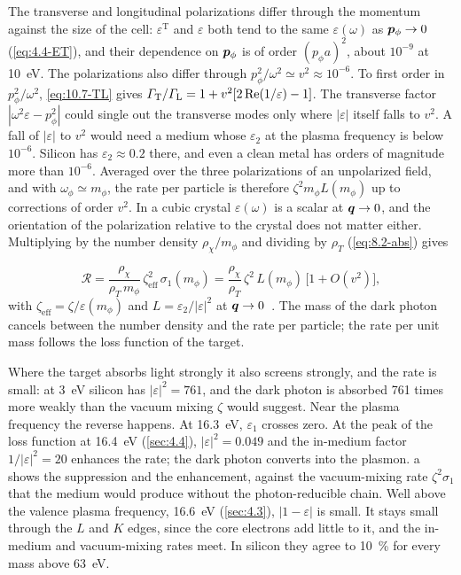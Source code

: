 The transverse and longitudinal polarizations differ through the momentum against the size of the cell: $\varepsilon^{\mathrm{T}}$ and $\varepsilon$ both tend to the same $\varepsilon(\omega)$ as $\bm{p}_\phi \to 0$ (\cref{eq:4.4-ET}), and their dependence on $\bm{p}_\phi$ is of order $(p_\phi a)^2$, about $10^{-9}$ at \SI{10}{eV}. The polarizations also differ through $p_\phi^2/\omega^2 \simeq v^2 \approx 10^{-6}$. To first order in $p_\phi^2/\omega^2$, \cref{eq:10.7-TL} gives $\varGamma_{\mathrm{T}}/\varGamma_{\mathrm{L}} = 1 + v^2[2\operatorname{Re}(1/\varepsilon) - 1]$. The transverse factor $|\omega^2\varepsilon - p_\phi^2|$ could single out the transverse modes only where $|\varepsilon|$ itself falls to $v^2$. A fall of $|\varepsilon|$ to $v^2$ would need a medium whose $\varepsilon_2$ at the plasma frequency is below $10^{-6}$. Silicon has $\varepsilon_2 \approx 0.2$ there, and even a clean metal has orders of magnitude more than $10^{-6}$. Averaged over the three polarizations of an unpolarized field, and with $\omega_\phi \simeq m_\phi$, the rate per particle is therefore $\zeta^2m_\phi L(m_\phi)$ up to corrections of order $v^2$. In a cubic crystal $\varepsilon(\omega)$ is a scalar at $\bm{q} \to 0$, and the orientation of the polarization relative to the crystal does not matter either. Multiplying by the number density $\rho_\chi/m_\phi$ and dividing by $\rho_T$ (\cref{eq:8.2-abs}) gives
\begin{keyresult}
\begin{equation}
  \mathcal{R} = \frac{\rho_\chi}{\rho_T\,m_\phi}\,\zeta_{\mathrm{eff}}^2\,\sigma_1(m_\phi) = \frac{\rho_\chi}{\rho_T}\,\zeta^2\,L(m_\phi)\,\bigl[1 + O(v^2)\bigr] ,
  \label{eq:10.7-dp}
\end{equation}
with $\zeta_{\mathrm{eff}} = \zeta/\varepsilon(m_\phi)$ and $L = \varepsilon_2/|\varepsilon|^2$ at $\bm{q} \to 0$~\cites[Eq.~(7)]{hochberg2017absorption}[Eq.~(3)]{berlin2024absorption}. The mass of the dark photon cancels between the number density and the rate per particle; the rate per unit mass follows the loss function of the target.
\end{keyresult}
\noindent Where the target absorbs light strongly it also screens strongly, and the rate is small: at \SI{3}{eV} silicon has $|\varepsilon|^2 = 761$, and the dark photon is absorbed 761 times more weakly than the vacuum mixing $\zeta$ would suggest. Near the plasma frequency the reverse happens. At \SI{16.3}{eV}, $\varepsilon_1$ crosses zero. At the peak of the loss function at \SI{16.4}{eV} (\cref{sec:4.4}), $|\varepsilon|^2 = 0.049$ and the in-medium factor $1/|\varepsilon|^2 = 20$ enhances the rate; the dark photon converts into the plasmon. a shows the suppression and the enhancement, against the vacuum-mixing rate $\zeta^2\sigma_1$ that the medium would produce without the photon-reducible chain. Well above the valence plasma frequency, \SI{16.6}{eV} (\cref{sec:4.3}), $|1 - \varepsilon|$ is small. It stays small through the $L$ and $K$ edges, since the core electrons add little to it, and the in-medium and vacuum-mixing rates meet. In silicon they agree to \SI{10}{\percent} for every mass above \SI{63}{eV}.

